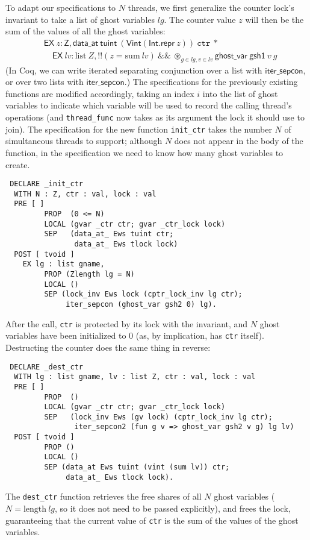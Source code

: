 \documentclass[11pt]{article} %
\begin{document}
To adapt our specifications to $N$ threads, we first generalize the counter lock's invariant to take a list of ghost variables $\mathit{lg}$. The counter value $z$ will then be the sum of the values of all the ghost variables:
\begin{align*}&\mathsf{EX}\ z : \mathsf{Z}, \mathsf{data\_at}\ \mathsf{tuint}\ (\mathsf{Vint} (\mathsf{Int.repr}\ z))\ \texttt{ctr}\ * \\&\quad\mathsf{EX}\ \mathit{lv} : \mathrm{list}\ Z, !!(z = \mathrm{sum}\ \mathit{lv}) \ \&\&\ \circledast_{g \in \mathit{lg}, v \in \mathit{lv}} \mathsf{ghost\_var}\ \mathsf{gsh1}\ v\ g\end{align*}
(In Coq, we can write iterated separating conjunction over a list with $\mathsf{iter\_sepcon}$, or over two lists with $\mathsf{iter\_sepcon}$.) The specifications for the previously existing functions are modified accordingly, taking an index $i$ into the list of ghost variables to indicate which variable will be used to record the calling thread's operations (and \texttt{thread\_func} now takes as its argument the lock it should use to join). The specification for the new function \texttt{init\_ctr} takes the number $N$ of simultaneous threads to support; although $N$ does not appear in the body of the function, in the specification we need to know how many ghost variables to create.
\begin{verbatim}
 DECLARE _init_ctr
  WITH N : Z, ctr : val, lock : val
  PRE [ ]
         PROP  (0 <= N)
         LOCAL (gvar _ctr ctr; gvar _ctr_lock lock)
         SEP   (data_at_ Ews tuint ctr;
                data_at_ Ews tlock lock)
  POST [ tvoid ]
    EX lg : list gname,
         PROP (Zlength lg = N)
         LOCAL ()
         SEP (lock_inv Ews lock (cptr_lock_inv lg ctr);
              iter_sepcon (ghost_var gsh2 0) lg).
\end{verbatim}
After the call, \texttt{ctr} is protected by its lock with the invariant, and $N$ ghost variables have been initialized to 0 (as, by implication, has \texttt{ctr} itself). Destructing the counter does the same thing in reverse:
\begin{verbatim}
 DECLARE _dest_ctr
  WITH lg : list gname, lv : list Z, ctr : val, lock : val
  PRE [ ]
         PROP  ()
         LOCAL (gvar _ctr ctr; gvar _ctr_lock lock)
         SEP   (lock_inv Ews (gv lock) (cptr_lock_inv lg ctr);
                iter_sepcon2 (fun g v => ghost_var gsh2 v g) lg lv)
  POST [ tvoid ]
         PROP ()
         LOCAL ()
         SEP (data_at Ews tuint (vint (sum lv)) ctr;
              data_at_ Ews tlock lock).
\end{verbatim}
The \texttt{dest\_ctr} function retrieves the free shares of all $N$ ghost variables ($N = \mathrm{length}\ \mathit{lg}$, so it does not need to be passed explicitly), and frees the lock, guaranteeing that the current value of \texttt{ctr} is the sum of the values of the ghost variables.
\end{document}
